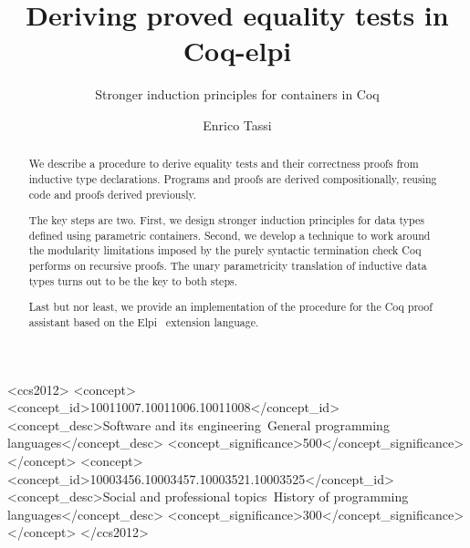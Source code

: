 \documentclass[sigplan,10pt,review]{acmart}\settopmatter{printfolios=true,printccs=false,printacmref=false}
\begin{document}
\title{Deriving proved equality tests in Coq-elpi}
\subtitle{Stronger induction principles for containers in Coq}

\author{Enrico Tassi}



\begin{abstract}
We describe a procedure to derive equality tests and their correctness
proofs from inductive type declarations.  Programs and proofs
are derived compositionally, reusing code and proofs derived
previously.  

The key steps are two. First, we
design stronger induction principles for data types defined
using parametric containers. Second, we
develop a technique to work around the modularity limitations
imposed by the purely syntactic termination check Coq performs
on recursive proofs. 
The unary parametricity translation of inductive data types
turns out to be the key to both steps.

Last but nor least, we provide an implementation of the procedure
	for the Coq proof assistant based on the Elpi~\cite{dunchev:hal-01176856} extension language.
\end{abstract}


\begin{CCSXML}
<ccs2012>
<concept>
<concept_id>10011007.10011006.10011008</concept_id>
<concept_desc>Software and its engineering~General programming languages</concept_desc>
<concept_significance>500</concept_significance>
</concept>
<concept>
<concept_id>10003456.10003457.10003521.10003525</concept_id>
<concept_desc>Social and professional topics~History of programming languages</concept_desc>
<concept_significance>300</concept_significance>
</concept>
</ccs2012>
\end{CCSXML}

\end{document}
